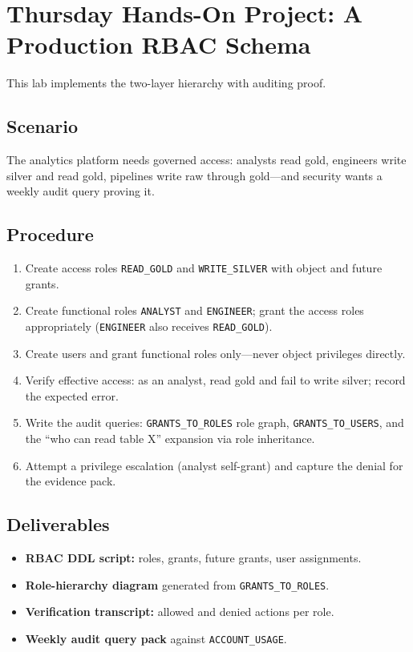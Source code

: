 \section{Thursday Hands-On Project: A Production RBAC Schema}
This lab implements the two-layer hierarchy with auditing proof.

\subsection*{Scenario}
The analytics platform needs governed access: analysts read gold, engineers write silver and read gold, pipelines write raw through gold---and security wants a weekly audit query proving it.

\subsection*{Procedure}
\begin{enumerate}
    \item Create access roles \texttt{READ\_GOLD} and \texttt{WRITE\_SILVER} with object and future grants.
    \item Create functional roles \texttt{ANALYST} and \texttt{ENGINEER}; grant the access roles appropriately (\texttt{ENGINEER} also receives \texttt{READ\_GOLD}).
    \item Create users and grant functional roles only---never object privileges directly.
    \item Verify effective access: as an analyst, read gold and fail to write silver; record the expected error.
    \item Write the audit queries: \texttt{GRANTS\_TO\_ROLES} role graph, \texttt{GRANTS\_TO\_USERS}, and the ``who can read table X'' expansion via role inheritance.
    \item Attempt a privilege escalation (analyst self-grant) and capture the denial for the evidence pack.
\end{enumerate}

\subsection*{Deliverables}
\begin{itemize}
    \item \textbf{RBAC DDL script:} roles, grants, future grants, user assignments.
    \item \textbf{Role-hierarchy diagram} generated from \texttt{GRANTS\_TO\_ROLES}.
    \item \textbf{Verification transcript:} allowed and denied actions per role.
    \item \textbf{Weekly audit query pack} against \texttt{ACCOUNT\_USAGE}.
\end{itemize}

